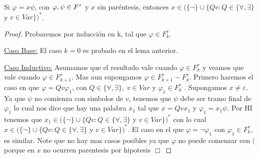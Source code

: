   \begin{lemma} \label{lemma_39}
    \PN Si $\varphi = x \psi$, con $\varphi, \psi \in F^{\tau}$ y $x$ sin paréntesis, entonces $x \in (\{\lnot\} \cup
    \{Qv: Q \in \{\forall, \exists\}$ y $v \in Var\})^{\ast}$.
  \end{lemma}
  \begin{proof}
    \PN Probaremos por inducción en k, tal que $\varphi \in F_{k}^{\tau}$.

    \vspace{3mm}
    \PN \underline{Caso Base:}
    El caso $k=0$ es probado en el lema anterior.

    \vspace{3mm}
		\PN \underline{Caso Inductivo:} Asumamos que el resultado vale cuando $ \varphi \in F_{k}^{\tau }$ y veamos que vale cuando $\varphi \in F_{k+1}^{\tau }$. Mas aun supongamos $\varphi \in F_{k+1}^{\tau }-F_{k}^{\tau }$. Primero haremos el caso en que $\varphi =Qv\varphi_{1}$, con $Q\in \{\forall ,\exists \},\;v\in Var$ y $\varphi_{1}\in F_{k}^{\tau }$ . Supongamos $x\neq \varepsilon $. Ya que $\psi $ no comienza con simbolos de $v$, tenemos que $\psi $ debe ser tramo final de $\varphi_{1}$ lo cual nos dice que hay una palabra $x_{1}$ tal que $x=Qvx_{1}$ y $\varphi_{1}=x_{1}\psi $. Por HI tenemos que $x_{1}\in (\{\lnot \}\cup \{Qv:Q\in \{\forall ,\exists \}$ y $v\in Var\})^{\ast }$ con lo cual $x\in (\{\lnot \}\cup \{Qv:Q\in \{\forall ,\exists \}$ y $v\in Var\})^{\ast }$. El caso en el que $\varphi =\lnot \varphi_{1}$ con $\varphi_{1}\in F_{k}^{\tau }$, es similar. Note que no hay mas casos posibles ya que $\varphi $ no puede comenzar con $($ porque en $x$ no ocurren parentesis por hipotesis $\Box$
  \end{proof}


